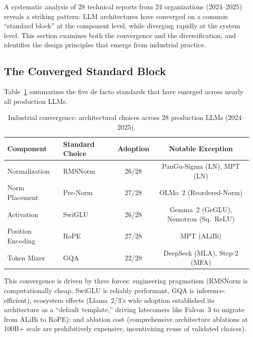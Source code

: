 \label{sec:industry}

A systematic analysis of 28 technical reports from 24 organizations (2024--2025) reveals a striking pattern: LLM architectures have converged on a common ``standard block'' at the component level, while diverging rapidly at the system level. This section examines both the convergence and the diversification, and identifies the design principles that emerge from industrial practice.

\subsection{The Converged Standard Block}
\label{subsec:standard_block}

Table~\ref{tab:industry_convergence} summarizes the five de facto standards that have emerged across nearly all production LLMs.

\begin{table}[t]
\centering
\caption{Industrial convergence: architectural choices across 28 production LLMs (2024--2025).}
\label{tab:industry_convergence}
\small
\begin{tabular}{llcc}
\hline
\textbf{Component} & \textbf{Standard Choice} & \textbf{Adoption} & \textbf{Notable Exception} \\
\hline
Normalization & RMSNorm~\cite{zhang2019root} & 26/28 & PanGu-Sigma (LN), MPT (LN) \\
Norm Placement & Pre-Norm & 27/28 & OLMo~2 (Reordered-Norm) \\
Activation & SwiGLU~\cite{shazeer2020glu} & 26/28 & Gemma~2 (GeGLU), Nemotron (Sq.\ ReLU) \\
Position Encoding & RoPE~\cite{su2024roformer} & 27/28 & MPT (ALiBi) \\
Token Mixer & GQA~\cite{ainslie2023gqa} & 22/28 & DeepSeek (MLA), Step-2 (MFA) \\
\hline
\end{tabular}
\end{table}

This convergence is driven by three forces: engineering pragmatism (RMSNorm is computationally cheap, SwiGLU is reliably performant, GQA is inference-efficient); ecosystem effects (Llama~2/3's wide adoption established its architecture as a ``default template,'' driving latecomers like Falcon~3 to migrate from ALiBi to RoPE); and ablation cost (comprehensive architecture ablations at 100B+ scale are prohibitively expensive, incentivizing reuse of validated choices).


